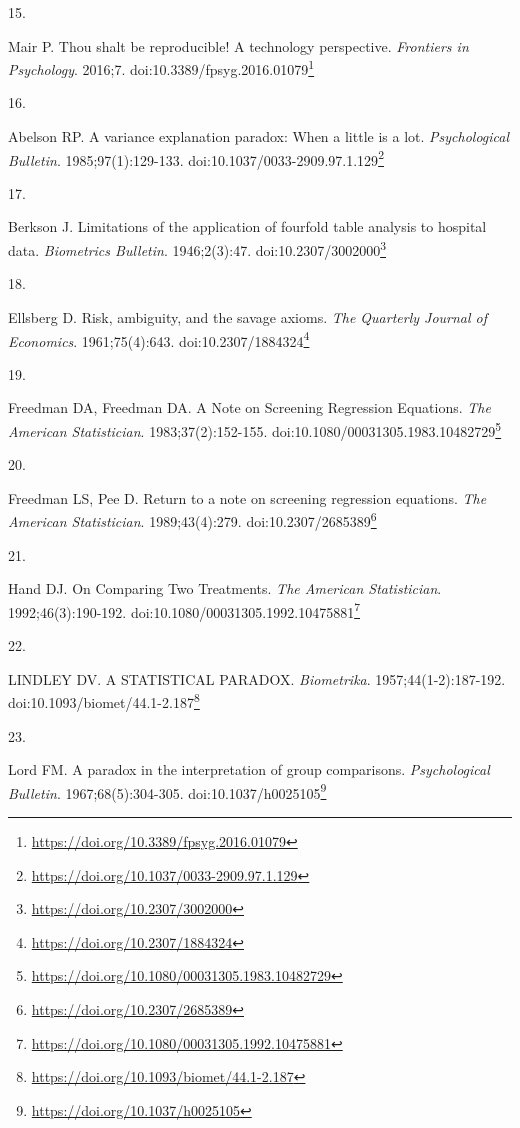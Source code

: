 \documentclass[
  a4paper,
]{book}
\newlength{\cslhangindent}
\newlength{\csllabelwidth}
\newlength{\cslentryspacingunit} %
\newenvironment{CSLReferences}[2] %
 {%
  \setlength{\parindent}{0pt}
  \ifodd #1
  \let\oldpar\par
  \def\par{\hangindent=\cslhangindent\oldpar}
  \fi
  \setlength{\parskip}{#2\cslentryspacingunit}
 }%
 {}
\newcommand{\CSLLeftMargin}[1]{\parbox[t]{\csllabelwidth}{#1}}
\newcommand{\CSLRightInline}[1]{\parbox[t]{\linewidth - \csllabelwidth}{#1}\break}
\renewcommand{\href}[2]{#2\footnote{\url{#1}}}
\begin{document}
\begin{CSLReferences}{0}{0}
\leavevmode{}%
\CSLLeftMargin{15. }%
\CSLRightInline{Mair P. Thou shalt be reproducible! A technology perspective. \emph{Frontiers in Psychology}. 2016;7. doi:\href{https://doi.org/10.3389/fpsyg.2016.01079}{10.3389/fpsyg.2016.01079}}

\leavevmode{}%
\CSLLeftMargin{16. }%
\CSLRightInline{Abelson RP. A variance explanation paradox: When a little is a lot. \emph{Psychological Bulletin}. 1985;97(1):129-133. doi:\href{https://doi.org/10.1037/0033-2909.97.1.129}{10.1037/0033-2909.97.1.129}}

\leavevmode{}%
\CSLLeftMargin{17. }%
\CSLRightInline{Berkson J. Limitations of the application of fourfold table analysis to hospital data. \emph{Biometrics Bulletin}. 1946;2(3):47. doi:\href{https://doi.org/10.2307/3002000}{10.2307/3002000}}

\leavevmode{}%
\CSLLeftMargin{18. }%
\CSLRightInline{Ellsberg D. Risk, ambiguity, and the savage axioms. \emph{The Quarterly Journal of Economics}. 1961;75(4):643. doi:\href{https://doi.org/10.2307/1884324}{10.2307/1884324}}

\leavevmode{}%
\CSLLeftMargin{19. }%
\CSLRightInline{Freedman DA, Freedman DA. A Note on Screening Regression Equations. \emph{The American Statistician}. 1983;37(2):152-155. doi:\href{https://doi.org/10.1080/00031305.1983.10482729}{10.1080/00031305.1983.10482729}}

\leavevmode{}%
\CSLLeftMargin{20. }%
\CSLRightInline{Freedman LS, Pee D. Return to a note on screening regression equations. \emph{The American Statistician}. 1989;43(4):279. doi:\href{https://doi.org/10.2307/2685389}{10.2307/2685389}}

\leavevmode{}%
\CSLLeftMargin{21. }%
\CSLRightInline{Hand DJ. On Comparing Two Treatments. \emph{The American Statistician}. 1992;46(3):190-192. doi:\href{https://doi.org/10.1080/00031305.1992.10475881}{10.1080/00031305.1992.10475881}}

\leavevmode{}%
\CSLLeftMargin{22. }%
\CSLRightInline{LINDLEY DV. A STATISTICAL PARADOX. \emph{Biometrika}. 1957;44(1-2):187-192. doi:\href{https://doi.org/10.1093/biomet/44.1-2.187}{10.1093/biomet/44.1-2.187}}

\leavevmode{}%
\CSLLeftMargin{23. }%
\CSLRightInline{Lord FM. A paradox in the interpretation of group comparisons. \emph{Psychological Bulletin}. 1967;68(5):304-305. doi:\href{https://doi.org/10.1037/h0025105}{10.1037/h0025105}}


\end{CSLReferences}
\end{document}
